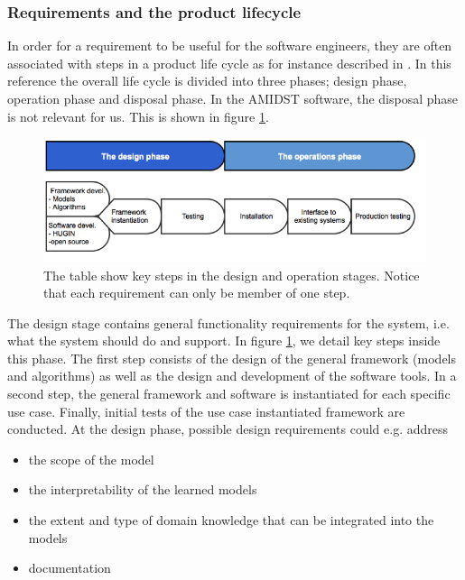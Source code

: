 \subsubsection*{Requirements and the product lifecycle}

In order for a requirement to be useful for the software engineers, they are often associated with steps in a product life cycle as for instance described in \cite{Eig09}.  In this reference the overall life cycle is divided into three phases; design phase, operation phase and disposal phase.  In the AMIDST software, the disposal phase is not relevant for us.  This is shown in figure \ref{REprocess2}.

\begin{figure}
\centering
\includegraphics [keepaspectratio,width = 14cm] {REprocess2}
\caption{The table show key steps in the design and operation stages. Notice that each requirement can only be member of one step.} 
\label{REprocess2}
\end{figure}

The design stage contains general functionality requirements for the system, i.e. what the system should do and support.  In figure \ref{REprocess2}, we detail key steps inside this phase. The first step consists of the design of the general framework (models and algorithms) as well as the design and development of the software tools. In a second step, the general framework and software is instantiated for each specific use case. Finally, initial tests of the use case instantiated framework are conducted.  At the design phase, possible design requirements could e.g. address
\begin{itemize}
 \item the scope of the model
 \item the interpretability of the learned models
 \item the extent and type of domain knowledge that can be integrated into the models
 \item documentation
\end{itemize}

